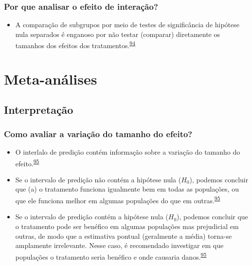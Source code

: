 \documentclass[
]{book}
\providecommand{\tightlist}{%
  \setlength{\itemsep}{0pt}\setlength{\parskip}{0pt}}
\begin{document}
\hypertarget{por-que-analisar-o-efeito-de-interauxe7uxe3o}{%
\subsection{Por que analisar o efeito de interação?}\label{por-que-analisar-o-efeito-de-interauxe7uxe3o}}

\begin{itemize}
\tightlist
\item
  A comparação de subgrupos por meio de testes de significância de hipótese nula separados é enganoso por não testar (comparar) diretamente os tamanhos dos efeitos dos tratamentos.\textsuperscript{\protect\hyperlink{ref-Matthews1996}{94}}
\end{itemize}

\hypertarget{meta-analises}{%
\chapter{\texorpdfstring{\textbf{Meta-análises}}{Meta-análises}}\label{meta-analises}}

\hypertarget{interpretacao}{%
\section{Interpretação}\label{interpretacao}}

\hypertarget{como-avaliar-a-variauxe7uxe3o-do-tamanho-do-efeito}{%
\subsection{Como avaliar a variação do tamanho do efeito?}\label{como-avaliar-a-variauxe7uxe3o-do-tamanho-do-efeito}}

\begin{itemize}
\item
  O interlalo de predição contém informação sobre a variação do tamanho do efeito.\textsuperscript{\protect\hyperlink{ref-Borenstein2022}{95}}
\item
  Se o intervalo de predição não contém a hipótese nula (\(H_{0}\)), podemos concluir que (a) o tratamento funciona igualmente bem em todas as populações, ou que ele funciona melhor em algumas populações do que em outras.\textsuperscript{\protect\hyperlink{ref-Borenstein2022}{95}}
\item
  Se o intervalo de predição contém a hipótese nula (\(H_{0}\)), podemos concluir que o tratamento pode ser benéfico em algumas populações mas prejudicial em outras, de modo que a estimativa pontual (geralmente a média) torna-se amplamente irrelevante. Nesse caso, é recomendado investigar em que populações o tratamento seria benéfico e onde causaria danos.\textsuperscript{\protect\hyperlink{ref-Borenstein2022}{95}}
\end{itemize}
\end{document}
